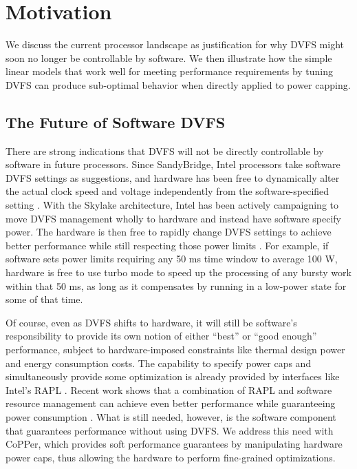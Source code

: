 \section{Motivation}
\label{sec:copper-motivation}

We discuss the current processor landscape as justification for why DVFS might soon no longer be controllable by software.
We then illustrate how the simple linear models that work well for meeting performance requirements by tuning DVFS can produce sub-optimal behavior when directly applied to power capping.


\subsection{The Future of Software DVFS}
There are strong indications that DVFS will not be directly controllable by software in future processors.
Since SandyBridge, Intel processors take software DVFS settings as suggestions, and hardware has been free to dynamically alter the actual clock speed and voltage independently from the software-specified setting \cite{lwn602479,KernelPstate}.
With the Skylake architecture, Intel has been actively campaigning to move DVFS management wholly to hardware and instead have software specify power.
The hardware is then free to rapidly change DVFS settings to achieve better performance while still respecting those power limits \cite{SpeedShift}.
For example, if software sets power limits requiring any 50 ms time window to average 100 W, hardware is free to use turbo mode to speed up the processing of any bursty work within that 50 ms, as long as it compensates by running in a low-power state for some of that time.

Of course, even as DVFS shifts to hardware, it will still be software's responsibility to provide its own notion of either ``best'' or ``good enough'' performance, subject to hardware-imposed constraints like thermal design power and energy consumption costs.
The capability to specify power caps and simultaneously provide some optimization is already provided by interfaces like Intel's RAPL \cite{RAPL}.
Recent work shows that a combination of RAPL and software resource management can achieve even better performance while guaranteeing power consumption \cite{pupil}.
What is still needed, however, is the software component that guarantees performance without using DVFS.
We address this need with CoPPer, which provides soft performance guarantees by manipulating hardware power caps, thus allowing the hardware to perform fine-grained optimizations.


